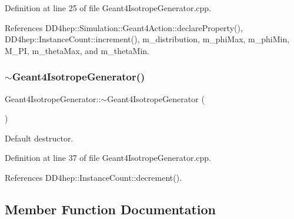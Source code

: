 Definition at line 25 of file Geant4\+Isotrope\+Generator.\+cpp.



References D\+D4hep\+::\+Simulation\+::\+Geant4\+Action\+::declare\+Property(), D\+D4hep\+::\+Instance\+Count\+::increment(), m\+\_\+distribution, m\+\_\+phi\+Max, m\+\_\+phi\+Min, M\+\_\+\+PI, m\+\_\+theta\+Max, and m\+\_\+theta\+Min.

\hypertarget{class_d_d4hep_1_1_simulation_1_1_geant4_isotrope_generator_a0c8cc2163617f319fd3b58a11b3e64ea}{}\label{class_d_d4hep_1_1_simulation_1_1_geant4_isotrope_generator_a0c8cc2163617f319fd3b58a11b3e64ea} 
\subsubsection{\texorpdfstring{$\sim$\+Geant4\+Isotrope\+Generator()}{~Geant4IsotropeGenerator()}}
{\footnotesize\ttfamily Geant4\+Isotrope\+Generator\+::$\sim$\+Geant4\+Isotrope\+Generator (\begin{DoxyParamCaption}{ }\end{DoxyParamCaption})\hspace{0.3cm}{\ttfamily [virtual]}}



Default destructor. 



Definition at line 37 of file Geant4\+Isotrope\+Generator.\+cpp.



References D\+D4hep\+::\+Instance\+Count\+::decrement().



\subsection{Member Function Documentation}
\hypertarget{class_d_d4hep_1_1_simulation_1_1_geant4_isotrope_generator_a6073247e3b5c587af44fcfb92fac6849}{}\label{class_d_d4hep_1_1_simulation_1_1_geant4_isotrope_generator_a6073247e3b5c587af44fcfb92fac6849} 
